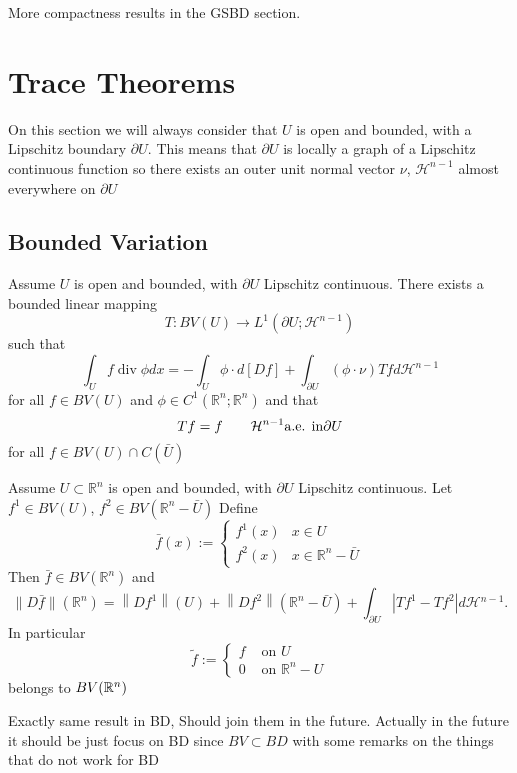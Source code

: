 More compactness results in the GSBD section.
\section{Trace Theorems}

On this section we will always consider that $U$ is open and bounded, with a Lipschitz boundary $\partial U$. This means that $\partial U$  is locally a graph of a Lipschitz continuous function so there exists an outer unit normal vector $\nu$, $\mathcal{H}^{n-1}$ almost everywhere on $\partial U$

\subsection{Bounded Variation}
\begin{theorem}
 Assume $U$ is open and bounded, with $\partial U$ Lipschitz continuous. There exists a bounded linear mapping
$$
T: B V(U) \rightarrow L^1\left(\partial U ; \mathcal{H}^{n-1}\right)
$$
such that
$$
\int_U f \operatorname{div} \phi d x=-\int_U \phi \cdot d[D f]+\int_{\partial U}(\phi \cdot \nu) T f d \mathcal{H}^{n-1}
$$
for all $f \in B V(U)$ and $\phi \in C^1\left(\mathbb{R}^n ; \mathbb{R}^n\right)$ and that
$$Tf = f\qquad {\mathcal H}^{n-1} \text{a.e. in} \partial U$$
for all $f\in BV(U)\cap C(\bar{U})$
\end{theorem}

\begin{theorem}
 Assume $U \subset \mathbb{R}^n$ is open and bounded, with $\partial U$ Lipschitz continuous. Let $f^1 \in B V(U)$, $f^2 \in B V\left(\mathbb{R}^n-\bar{U}\right)$
Define
$$
\bar{f}(x):= \begin{cases}f^1(x) & x \in U \\ f^2(x) & x \in \mathbb{R}^n-\bar{U}\end{cases}
$$
Then
$\bar{f} \in B V\left(\mathbb{R}^n\right)$
and
$$
\|D \bar{f}\|\left(\mathbb{R}^n\right)=\left\|D f^1\right\|(U)+\left\|D f^2\right\|\left(\mathbb{R}^n-\bar{U}\right)+\int_{\partial U}\left|T f^1-T f^2\right| d \mathcal{H}{ }^{n-1} .
$$
In particular $$\tilde{f}:= \begin{cases}f & \text { on } U \\ 0 & \text { on } \mathbb{R}^n-U\end{cases}$$
belongs to $BV(\mathbb{R}^n)$
\end{theorem}
\begin{com}
Exactly same result in BD, Should join them in the future. Actually in the future it should be just focus on BD since $BV \subset BD$ with some remarks on the things that do not work for BD
\end{com}


